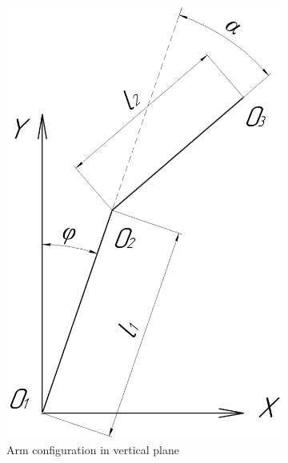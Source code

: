 \documentclass[journal,twocolumn]{IEEEtran}
\begin{document}
\begin{figure}[!h]
    \centering
    \begin{subfigure}{0.2\textwidth}
        \includegraphics[width = \linewidth]{Figures/mathmodel.png}
        \caption{Arm configuration in vertical plane}
        \label{fig:mathModelVert}
    \end{subfigure}
    \begin{subfigure}{0.35\textwidth}

\end{subfigure}
\end{figure}
\end{document}
